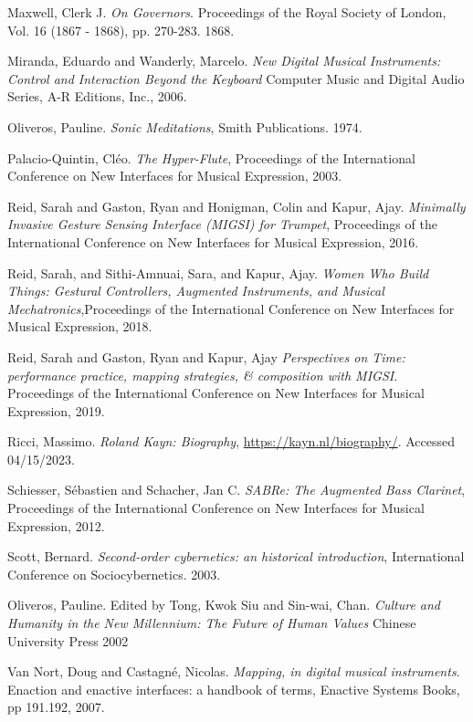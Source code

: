 \begin{thebibliography}{99}
 Maxwell, Clerk J. \emph{On Governors}. Proceedings of the Royal Society of London, Vol. 16 (1867 - 1868), pp. 270-283. 1868.

 Miranda, Eduardo and Wanderly, Marcelo. \emph{New Digital Musical Instruments: Control and Interaction Beyond the Keyboard} Computer Music and Digital Audio Series, A-R Editions, Inc., 2006.

 Oliveros, Pauline. \emph{Sonic Meditations}, Smith Publications. 1974.

 Palacio-Quintin, Cléo. \emph{The Hyper-Flute}, Proceedings of the International Conference on New Interfaces for Musical Expression, 2003.

 Reid, Sarah and Gaston, Ryan and Honigman, Colin and Kapur, Ajay. \emph{Minimally Invasive Gesture Sensing Interface (MIGSI) for Trumpet}, Proceedings of the International Conference on New Interfaces for Musical Expression, 2016.

 Reid, Sarah, and Sithi-Amnuai, Sara, and Kapur, Ajay. \emph{Women Who Build Things: Gestural Controllers, Augmented Instruments, and Musical Mechatronics},Proceedings of the International Conference on New Interfaces for Musical Expression, 2018.

 Reid, Sarah and Gaston, Ryan and Kapur, Ajay \emph{Perspectives on Time: performance practice, mapping strategies, \& composition with MIGSI}. Proceedings of the International Conference on New Interfaces for Musical Expression, 2019.

 Ricci, Massimo. \emph{Roland Kayn: Biography}, \url{https://kayn.nl/biography/}. Accessed 04/15/2023.

 Schiesser, S{\'e}bastien and Schacher, Jan C. \emph{SABRe: The Augmented Bass Clarinet}, Proceedings of the International Conference on New Interfaces for Musical Expression, 2012.

 Scott, Bernard. \emph{Second-order cybernetics: an historical introduction}, International Conference on Sociocybernetics. 2003.

 Oliveros, Pauline. Edited by Tong, Kwok Siu and Sin-wai, Chan. \emph{Culture and Humanity in the New Millennium: The Future of Human Values} Chinese University Press 2002

 Van Nort, Doug and Castagné, Nicolas. \emph{Mapping, in digital musical instruments}. Enaction and enactive interfaces: a handbook of terms, Enactive Systems Books, pp 191.192, 2007.


\end{thebibliography}
